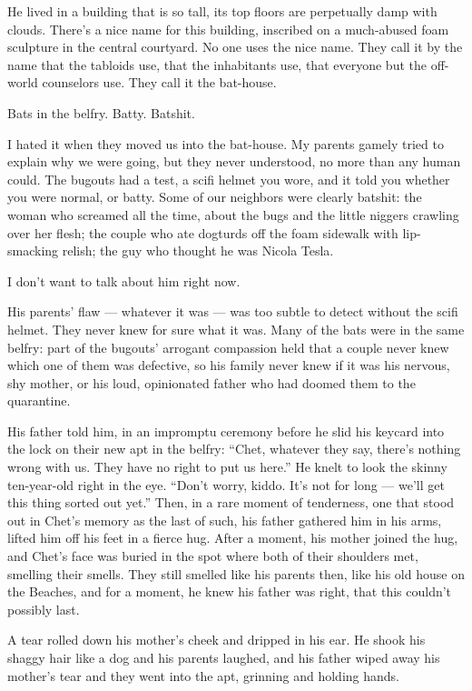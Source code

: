 He lived in a building that is so tall, its top floors are
perpetually damp with clouds. There's a nice name for this
building, inscribed on a much-abused foam sculpture in the central
courtyard. No one uses the nice name. They call it by the name that
the tabloids use, that the inhabitants use, that everyone but the
off-world counselors use. They call it the bat-house.

Bats in the belfry. Batty. Batshit.

I hated it when they moved us into the bat-house. My parents gamely
tried to explain why we were going, but they never understood, no
more than any human could. The bugouts had a test, a scifi helmet
you wore, and it told you whether you were normal, or batty. Some
of our neighbors were clearly batshit: the woman who screamed all
the time, about the bugs and the little niggers crawling over her
flesh; the couple who ate dogturds off the foam sidewalk with
lip-smacking relish; the guy who thought he was Nicola Tesla.

I don't want to talk about him right now.

His parents' flaw --- whatever it was --- was too subtle to detect
without the scifi helmet. They never knew for sure what it was.
Many of the bats were in the same belfry: part of the bugouts'
arrogant compassion held that a couple never knew which one of them
was defective, so his family never knew if it was his nervous, shy
mother, or his loud, opinionated father who had doomed them to the
quarantine.

His father told him, in an impromptu ceremony before he slid his
keycard into the lock on their new apt in the belfry:
``Chet, whatever they say, there's nothing wrong with us. They have no right to 
put us here.''
He knelt to look the skinny ten-year-old right in the eye.
``Don't worry, kiddo. It's not for long --- we'll get this thing sorted out 
yet.''
Then, in a rare moment of tenderness, one that stood out in Chet's
memory as the last of such, his father gathered him in his arms,
lifted him off his feet in a fierce hug. After a moment, his mother
joined the hug, and Chet's face was buried in the spot where both
of their shoulders met, smelling their smells. They still smelled
like his parents then, like his old house on the Beaches, and for a
moment, he knew his father was right, that this couldn't possibly
last.

A tear rolled down his mother's cheek and dripped in his ear. He
shook his shaggy hair like a dog and his parents laughed, and his
father wiped away his mother's tear and they went into the apt,
grinning and holding hands.

